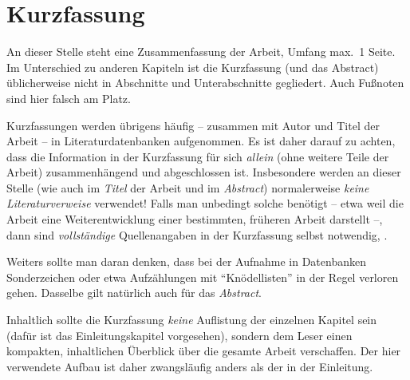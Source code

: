 
\chapter{Kurzfassung}

An dieser Stelle steht eine Zusammenfassung der Arbeit, Umfang
max.\ 1 Seite. Im Unterschied zu anderen Kapiteln ist die
Kurzfassung (und das Abstract) üblicherweise nicht in Abschnitte
und Unterabschnitte gegliedert. 
Auch Fußnoten sind hier falsch am Platz.

Kurzfassungen werden übrigens häufig -- zusammen mit Autor und Titel
der Arbeit -- %
in Literaturdatenbanken aufgenommen. Es ist daher darauf zu
achten, dass die Information in der Kurzfassung für sich 
\emph{allein} (\dah ohne weitere Teile der Arbeit) zusammenhängend und
abgeschlossen ist. Insbesondere werden an dieser Stelle (wie \ua
auch im \emph{Titel} der Arbeit und im \emph{Abstract})
normalerweise \emph{keine Literaturverweise} verwendet! Falls man
unbedingt solche benötigt -- etwa weil die Arbeit eine
Weiterentwicklung einer bestimmten, früheren Arbeit darstellt --,
dann sind \emph{vollständige} Quellenangaben in der Kurzfassung
selbst notwendig, .

Weiters sollte man daran denken, dass bei der Aufnahme in Datenbanken
Sonderzeichen oder etwa Aufzählungen mit "`Knödellisten"' in der
Regel verloren gehen. Dasselbe gilt natürlich auch für das 
\emph{Abstract}.


Inhaltlich sollte die Kurzfassung \emph{keine} Auflistung der
einzelnen Kapitel sein (dafür ist das Einleitungskapitel
vorgesehen), sondern dem Leser einen kompakten, inhaltlichen
Überblick über die gesamte Arbeit verschaffen. Der hier verwendete
Aufbau ist daher zwangsläufig anders als der in der Einleitung.
